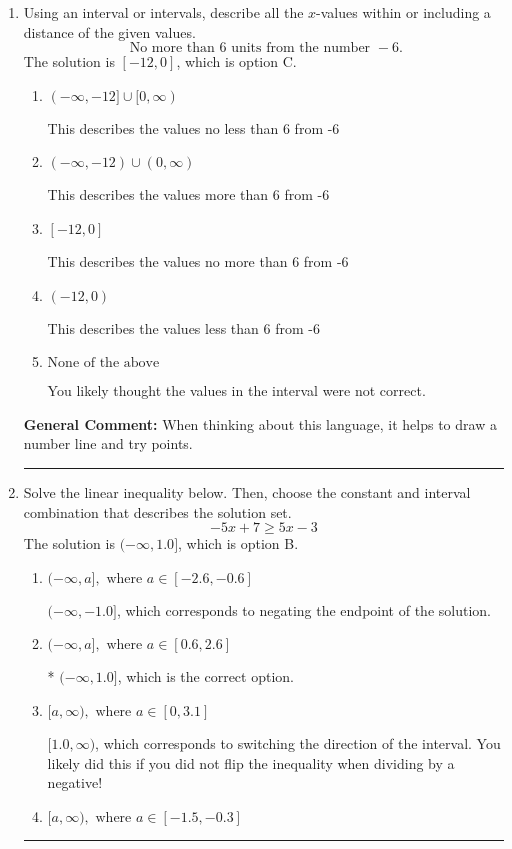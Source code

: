 \documentclass{extbook}[14pt]
\newcommand{\litem}[1]{\item #1

\rule{\textwidth}{0.4pt}}
\begin{document}
\begin{enumerate}
{\begin{enumerate}[label=\Alph*.]
You may have chosen this if you thought the inequality did not match the ends of the intervals.
\end{enumerate}

\textbf{General Comment:} Remember that less/greater than or equal to includes the endpoint, while less/greater do not. Also, remember that you need to flip the inequality when you multiply or divide by a negative.
}
\litem{
Using an interval or intervals, describe all the $x$-values within or including a distance of the given values.
\[ \text{ No more than } 6 \text{ units from the number } -6. \]The solution is \( [-12, 0] \), which is option C.\begin{enumerate}[label=\Alph*.]
\item \( (-\infty, -12] \cup [0, \infty) \)

This describes the values no less than 6 from -6
\item \( (-\infty, -12) \cup (0, \infty) \)

This describes the values more than 6 from -6
\item \( [-12, 0] \)

This describes the values no more than 6 from -6
\item \( (-12, 0) \)

This describes the values less than 6 from -6
\item \( \text{None of the above} \)

You likely thought the values in the interval were not correct.
\end{enumerate}

\textbf{General Comment:} When thinking about this language, it helps to draw a number line and try points.
}
\litem{
Solve the linear inequality below. Then, choose the constant and interval combination that describes the solution set.
\[ -5x + 7 \geq 5x -3 \]The solution is \( (-\infty, 1.0] \), which is option B.\begin{enumerate}[label=\Alph*.]
\item \( (-\infty, a], \text{ where } a \in [-2.6, -0.6] \)

 $(-\infty, -1.0]$, which corresponds to negating the endpoint of the solution.
\item \( (-\infty, a], \text{ where } a \in [0.6, 2.6] \)

* $(-\infty, 1.0]$, which is the correct option.
\item \( [a, \infty), \text{ where } a \in [0, 3.1] \)

 $[1.0, \infty)$, which corresponds to switching the direction of the interval. You likely did this if you did not flip the inequality when dividing by a negative!
\item \( [a, \infty), \text{ where } a \in [-1.5, -0.3] \)


\end{enumerate}}
\end{enumerate}
\end{document}
